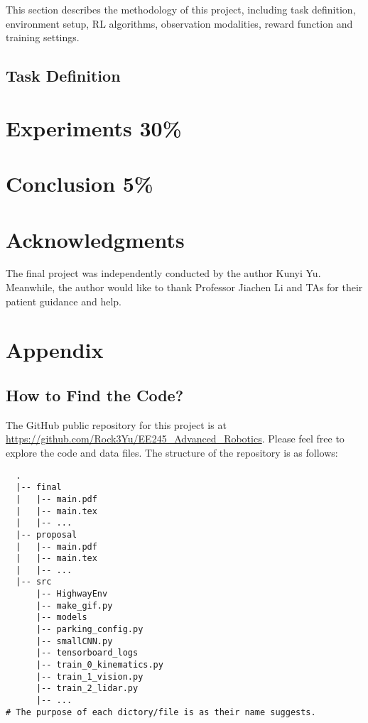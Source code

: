 \documentclass{article}
\begin{document}
This section describes the methodology of this project, including task definition, environment setup, RL algorithms, observation modalities, reward function and training settings.

\subsection{Task Definition}



\section{Experiments 30\%}\label{sec:experiments}

\section{Conclusion 5\%}\label{sec:conclusion}














\newpage

\section*{Acknowledgments}
The final project was independently conducted by the author Kunyi Yu. Meanwhile, the author would like to thank Professor Jiachen Li and TAs for their patient guidance and help.




\appendix
\section*{Appendix}
\subsection*{How to Find the Code?}
The GitHub public repository for this project is at \url{https://github.com/Rock3Yu/EE245_Advanced_Robotics}. Please feel free to explore the code and data files. The structure of the repository is as follows:

\begin{verbatim}
  .
  |-- final
  |   |-- main.pdf
  |   |-- main.tex
  |   |-- ...
  |-- proposal
  |   |-- main.pdf
  |   |-- main.tex
  |   |-- ...
  |-- src
      |-- HighwayEnv
      |-- make_gif.py
      |-- models
      |-- parking_config.py
      |-- smallCNN.py
      |-- tensorboard_logs
      |-- train_0_kinematics.py
      |-- train_1_vision.py
      |-- train_2_lidar.py
      |-- ...
# The purpose of each dictory/file is as their name suggests.
\end{verbatim}
\end{document}
